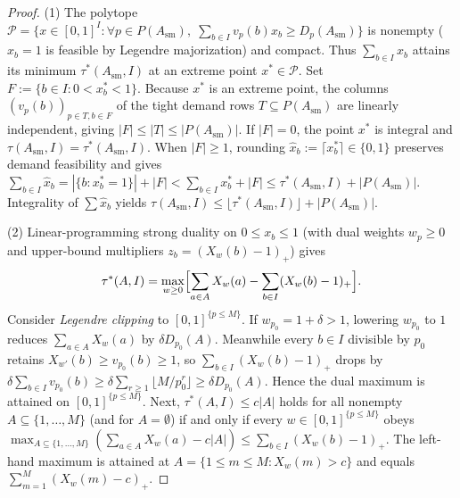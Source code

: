 \documentclass[11pt]{article}
\theoremstyle{remark}
\begin{document}
\begin{proof}
(1) The polytope $\mathcal{P} = \{x \in [0, 1]^I : \forall p \in P(A_{\mathrm{sm}}), \; \sum_{b \in I} v_p(b) x_b \ge D_p(A_{\mathrm{sm}})\}$ is nonempty ($x_b = 1$ is feasible by Legendre majorization) and compact. Thus $\sum_{b \in I} x_b$ attains its minimum $\tau^*(A_{\mathrm{sm}}, I)$ at an extreme point $x^* \in \mathcal{P}$. Set $F := \{b \in I : 0 < x^*_b < 1\}$. Because $x^*$ is an extreme point, the columns $(v_p(b))_{p \in T, b \in F}$ of the tight demand rows $T \subseteq P(A_{\mathrm{sm}})$ are linearly independent, giving $|F| \le |T| \le |P(A_{\mathrm{sm}})|$. If $|F| = 0$, the point $x^*$ is integral and $\tau(A_{\mathrm{sm}}, I) = \tau^*(A_{\mathrm{sm}}, I)$. When $|F| \ge 1$, rounding $\hat{x}_b := \lceil x^*_b \rceil \in \{0, 1\}$ preserves demand feasibility and gives $\sum_{b \in I} \hat{x}_b = |\{b : x^*_b = 1\}| + |F| < \sum_{b \in I} x^*_b + |F| \le \tau^*(A_{\mathrm{sm}}, I) + |P(A_{\mathrm{sm}})|$. Integrality of $\sum \hat{x}_b$ yields $\tau(A_{\mathrm{sm}}, I) \le \lfloor \tau^*(A_{\mathrm{sm}}, I) \rfloor + |P(A_{\mathrm{sm}})|$.

(2) Linear-programming strong duality on $0 \le x_b \le 1$ (with dual weights $w_p \ge 0$ and upper-bound multipliers $z_b = (X_w(b) - 1)_+$) gives
\[
\tau^*(A, I) = \max_{w \ge 0} \Bigl[ \sum_{a \in A} X_w(a) - \sum_{b \in I} (X_w(b) - 1)_+ \Bigr].
\]
Consider \emph{Legendre clipping} to $[0, 1]^{\{p \le M\}}$. If $w_{p_0} = 1 + \delta > 1$, lowering $w_{p_0}$ to $1$ reduces $\sum_{a \in A} X_w(a)$ by $\delta D_{p_0}(A)$. Meanwhile every $b \in I$ divisible by $p_0$ retains $X_{w'}(b) \ge v_{p_0}(b) \ge 1$, so $\sum_{b \in I} (X_w(b) - 1)_+$ drops by $\delta \sum_{b \in I} v_{p_0}(b) \ge \delta \sum_{r \ge 1} \lfloor M / p_0^r \rfloor \ge \delta D_{p_0}(A)$. Hence the dual maximum is attained on $[0, 1]^{\{p \le M\}}$. Next, $\tau^*(A, I) \le c |A|$ holds for all nonempty $A \subseteq \{1, \dots, M\}$ (and for $A = \emptyset$) if and only if every $w \in [0, 1]^{\{p \le M\}}$ obeys $\max_{A \subseteq \{1, \dots, M\}} (\sum_{a \in A} X_w(a) - c |A|) \le \sum_{b \in I} (X_w(b) - 1)_+$. The left-hand maximum is attained at $A = \{1 \le m \le M : X_w(m) > c\}$ and equals $\sum_{m = 1}^M (X_w(m) - c)_+$.


\end{proof}
\end{document}
